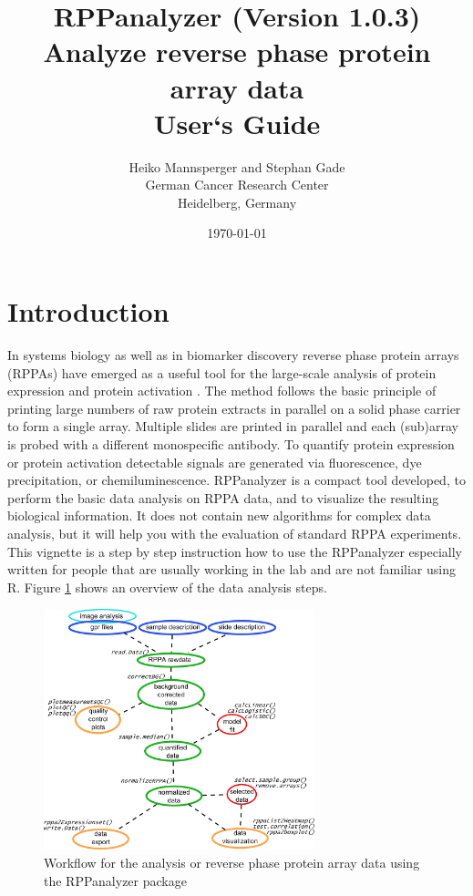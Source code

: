 \documentclass[12pt]{article}
\begin{document}

\title{RPPanalyzer {\small(Version 1.0.3)}\\Analyze reverse phase protein array data\\[5mm]
User`s Guide \\}

\author{Heiko Mannsperger and Stephan Gade\\
German Cancer Research Center\\
Heidelberg, Germany}

\date{\today}
\maketitle

\tableofcontents{}

\section{Introduction}

In systems biology as well as in biomarker discovery reverse phase
protein arrays (RPPAs) have emerged as a useful tool for the
large-scale analysis of protein expression and protein activation \citep{Paweletz2001f}.
The method follows the basic principle
of printing large numbers of raw protein extracts in parallel
on a solid phase carrier to form a single array. Multiple slides
are printed in parallel and each (sub)array is probed with a
different monospecific antibody. To quantify protein expression or
protein activation detectable signals are generated via fluorescence,
dye precipitation, or chemiluminescence.
RPPanalyzer is a compact tool developed, to perform the basic data analysis on RPPA data, and to
visualize the resulting biological information. It does not contain new algorithms
 for complex data analysis, but it will help you with the evaluation of standard RPPA experiments.
This vignette is a step by step instruction how to use the RPPanalyzer especially 
written for people that are usually working in the lab and are not familiar using R.
Figure \ref{workflow} shows an overview of the data analysis steps.

\begin{figure}%
\centerline{\includegraphics[width=0.7\textwidth]{workflow_RPPanalyzer.png}}
\caption{Workflow for the analysis or reverse phase protein array data using the
RPPanalyzer package}
\label{workflow}
\end{figure}
\end{document}
